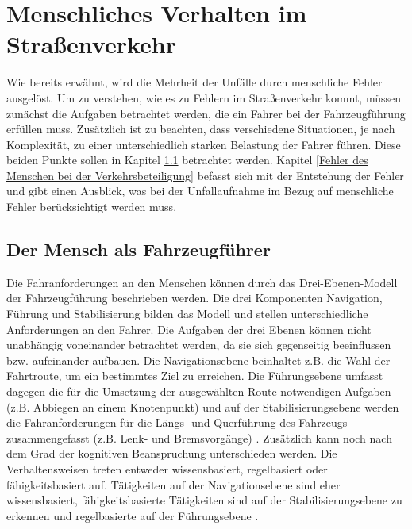\section{Menschliches Verhalten im Straßenverkehr}
Wie bereits erwähnt, wird die Mehrheit der Unfälle durch menschliche Fehler ausgelöst. Um zu verstehen, wie es zu Fehlern im Straßenverkehr kommt, müssen zunächst die Aufgaben betrachtet werden, die ein Fahrer bei der Fahrzeugführung erfüllen muss. Zusätzlich ist zu beachten, dass verschiedene Situationen, je nach Komplexität, zu einer unterschiedlich starken Belastung der Fahrer führen. Diese beiden Punkte sollen in Kapitel \ref{Der Mensch als Fahrzzeugführer} betrachtet werden. Kapitel \ref{Fehler des Menschen bei der Verkehrsbeteiligung} befasst sich mit der Entstehung der Fehler und gibt einen Ausblick, was bei der Unfallaufnahme im Bezug auf menschliche Fehler berücksichtigt werden muss.

\subsection{Der Mensch als Fahrzeugführer}\label{Der Mensch als Fahrzzeugführer}
Die Fahranforderungen an den Menschen können durch das Drei-Ebenen-Modell der Fahrzeugführung beschrieben werden. Die drei Komponenten Navigation, Führung und Stabilisierung bilden das Modell und stellen unterschiedliche Anforderungen an den Fahrer. Die Aufgaben der drei Ebenen können nicht unabhängig voneinander betrachtet werden, da sie sich gegenseitig beeinflussen bzw. aufeinander aufbauen. Die Navigationsebene beinhaltet z.B. die Wahl der Fahrtroute, um ein bestimmtes Ziel zu erreichen. Die Führungsebene umfasst dagegen die für die Umsetzung der ausgewählten Route notwendigen Aufgaben (z.B. Abbiegen an einem Knotenpunkt) und auf der Stabilisierungsebene werden die Fahranforderungen für die Längs- und Querführung des Fahrzeugs zusammengefasst (z.B. Lenk- und Bremsvorgänge) \parencite[S. 16]{Gerstenberger.17.02.2015}. Zusätzlich kann noch nach dem Grad der kognitiven Beanspruchung unterschieden werden. Die Verhaltensweisen treten entweder wissensbasiert, regelbasiert oder fähigkeitsbasiert auf. Tätigkeiten auf der Navigationsebene sind eher wissensbasiert, fähigkeitsbasierte Tätigkeiten sind auf der Stabilisierungsebene zu erkennen und regelbasierte auf der Führungsebene \parencite[S. 45]{Grundl.2005}.


